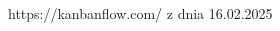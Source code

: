 \documentclass[polish,12pt,twoside,a4paper]{report}
\begin{document}




\newpage






\begin{thebibliography}{6}

 https://kanbanflow.com/ z dnia 16.02.2025
\end{thebibliography}
\newpage


\end{document}
